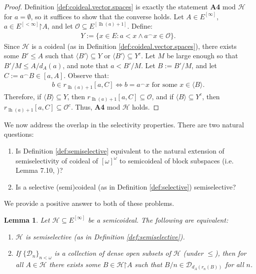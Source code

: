 \documentclass[11pt,reqno]{amsart}
\theoremstyle{plain}
\numberwithin{equation}{section}
\newtheorem{lemma}[theorem]{Lemma}
\theoremstyle{definition}
\newcommand{\func}{\operatorname}
\renewcommand{\c}[1]{\langle #1 \rangle}
\newcommand{\cal}{\mathcal}
\newcommand{\restrictedto}{\mathord{\upharpoonright}}
\renewcommand{\H}{\cal{H}}
\newcommand{\lh}{\func{lh}}
\renewcommand{\O}{\cal{O}}
\newcommand{\D}{\cal{D}}
\begin{document}
\begin{proof}
    Definition \ref{def:coideal.vector.spaces} is exactly the statement \textbf{A4} mod $\H$ for $a = \emptyset$, so it suffices to show that the converse holds. Let $A \in E^{[\infty]}$, $a \in E^{[<\infty]}\restrictedto A$, and let $\O \subseteq E^{[\lh(a)+1]}$. Define:
    \begin{align*}
        Y := \{x \in E : a < x \wedge a^\frown x \in \O\}.
    \end{align*}
    Since $\H$ is a coideal (as in Definition \ref{def:coideal.vector.spaces}), there exists some $B' \leq A$ such that $\c{B'} \subseteq Y$ or $\c{B'} \subseteq Y^c$. Let $M$ be large enough so that $B'/M \leq A/d_A(a)$, and note that $a < B'/M$. Let $B := B'/M$, and let $C := a^\frown B \in [a,A]$. Observe that:
    \begin{align*}
        b \in r_{\lh(a)+1}[a,C] \iff b = a^\frown x \text{ for some $x \in \c{B}$}.
    \end{align*}
    Therefore, if $\c{B} \subseteq Y$, then $r_{\lh(a)+1}[a,C] \subseteq \O$, and if $\c{B} \subseteq Y^c$, then $r_{\lh(a)+1}[a,C] \subseteq \O^c$. Thus, \textbf{A4} mod $\H$ holds.
\end{proof}

We now address the overlap in the selectivity properties. There are two natural questions:
\begin{enumerate}
    \item Is Definition \ref{def:semiselective} equivalent to the natural extension of semiselectivity of coideal of $[\omega]^\omega$ to semicoideal of block subspaces (i.e. Lemma 7.10, \cite{T10})?

    \item Is a selective (semi)coideal (as in Definition \ref{def:selective}) semiselective?
\end{enumerate}

We provide a positive answer to both of these problems.

\begin{lemma}
\label{lem:semiselectivity.equivalence}
    Let $\H \subseteq E^{[\infty]}$ be a semicoideal. The following are equivalent:
    \begin{enumerate}
        \item $\H$ is semiselective (as in Definition \ref{def:semiselective}).
        
        \item If $\{\D_n\}_{n<\omega}$ is a collection of dense open subsets of $\H$ (under $\leq$), then for all $A \in \H$ there exists some $B \in \H\restrictedto A$ such that $B/n \in \D_{d_A(r_n(B))}$ for all $n$.
    \end{enumerate}
\end{lemma}
\end{document}
